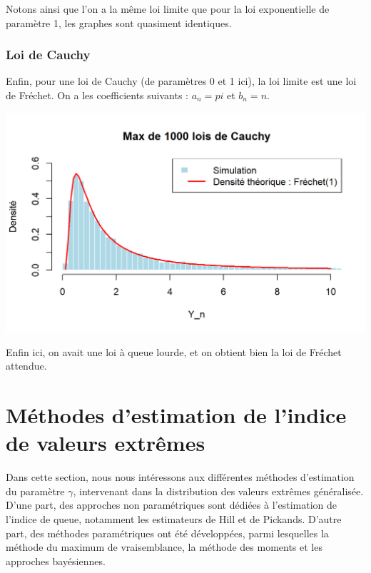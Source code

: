 \documentclass{article}
\begin{document}
\noindent Notons ainsi que l'on a la même loi limite que pour la loi exponentielle de paramètre 1, les graphes sont quasiment identiques.

\subsubsection{Loi de Cauchy}

\noindent Enfin, pour une loi de Cauchy (de paramètres 0 et 1 ici), la loi limite est une loi de Fréchet. On a les coefficients suivants : $a_n = pi $ et $b_n = n $.

\begin{center}
	\includegraphics[scale=0.8]{./Codes_R/Max_Cauchy.png} 
\end{center}

\noindent Enfin ici, on avait une loi à queue lourde, et on obtient bien la loi de Fréchet attendue.

\newpage

\section{Méthodes d'estimation de l'indice de valeurs extrêmes}
Dans cette section, nous nous intéressons aux différentes méthodes d'estimation du paramètre \(\gamma\), intervenant dans la distribution des valeurs extrêmes généralisée. \\
D'une part, des approches non paramétriques sont dédiées à l'estimation de l'indice de queue, notamment les estimateurs de Hill et de Pickands. D'autre part, des méthodes paramétriques ont été développées, parmi lesquelles la méthode du maximum de vraisemblance, la méthode des moments et les approches bayésiennes. \\
\end{document}
